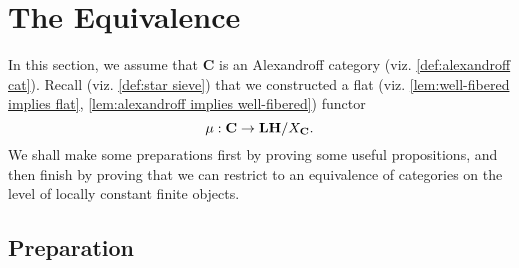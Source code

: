 %
%

\chapter{The Equivalence}

In this section, we assume that $\mathbf{C}$ is an Alexandroff category (viz. \cref{def:alexandroff cat}). Recall (viz. \cref{def:star sieve}) that we constructed a flat (viz. \cref{lem:well-fibered implies flat}, \cref{lem:alexandroff implies well-fibered}) functor
\[ \operatorname{\mu} : \mathbf{C} \to \mathbf{LH}/X_{\mathbf{C}}. \]
We shall make some preparations first by proving some useful propositions, and then finish by proving that we can restrict to an equivalence of categories on the level of locally constant finite objects.
\section{Preparation}

